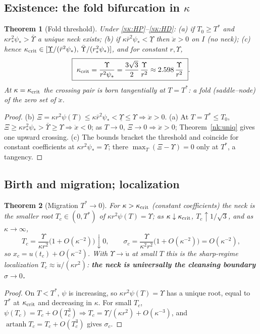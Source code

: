 \documentclass[11pt,a4paper]{article}
\theoremstyle{plain}
\newtheorem{theorem}{Theorem}[section]
\theoremstyle{definition}
\theoremstyle{remark}
\begin{document}
\subsection*{Existence: the fold bifurcation in \texorpdfstring{\(\kappa\)}{kappa}}
\begin{theorem}[Fold threshold]\label{nk:fold}
Under \textsc{\ref{nk:HP}--\ref{nk:HD}}: \textup{(a)} if \(T_0\ge T^*\) and \(\kappa r_*^2\psi_*>\bar\Upsilon\)
a unique neck exists; \textup{(b)} if \(\kappa\bar r^2\psi_*<\underline\Upsilon\) then \(\ddot x>0\)
on \(I\) (no neck); \textup{(c)} hence
\(\kappa_{\rm crit}\in[\underline\Upsilon/(\bar r^2\psi_*),\,\bar\Upsilon/(r_*^2\psi_*)]\), and for
constant \(r,\Upsilon\),
\[
\boxed{\ \kappa_{\rm crit}=\frac{\Upsilon}{r^2\psi_*}=\frac{3\sqrt3}{2}\,\frac{\Upsilon}{r^2}\approx2.598\,\frac{\Upsilon}{r^2}\ }.
\]
At \(\kappa=\kappa_{\rm crit}\) the crossing pair is born tangentially at \(T=T^*\): a fold
(saddle--node) of the zero set of \(\ddot x\).
\end{theorem}
\begin{proof}
(b) \(\Xi=\kappa r^2\psi(T)\le\kappa\bar r^2\psi_*<\underline\Upsilon\le\Upsilon\Rightarrow\ddot x>0\).
(a) At \(T=T^*\le T_0\), \(\Xi\ge\kappa r_*^2\psi_*>\bar\Upsilon\ge\Upsilon\Rightarrow\ddot x<0\); as
\(T\to0\), \(\Xi\to0\Rightarrow\ddot x>0\); Theorem~\ref{nk:uniq} gives one upward crossing. (c) The
bounds bracket the threshold and coincide for constant coefficients at \(\kappa r^2\psi_*=\Upsilon\);
there \(\max_T(\Xi-\Upsilon)=0\) only at \(T^*\), a tangency.
\end{proof}

\subsection*{Birth and migration; localization}
\begin{theorem}[Migration \texorpdfstring{\(T^*\to0\)}{}]\label{nk:mig}
For \(\kappa>\kappa_{\rm crit}\) (constant coefficients) the neck is the smaller root \(T_c\in(0,T^*)\)
of \(\kappa r^2\psi(T)=\Upsilon\); as \(\kappa\downarrow\kappa_{\rm crit}\), \(T_c\uparrow1/\sqrt3\),
and as \(\kappa\to\infty\),
\[
T_c=\frac{\Upsilon}{\kappa r^2}\bigl(1+O(\kappa^{-2})\bigr)\downarrow0,\qquad
\sigma_c=\frac{\Upsilon}{\kappa^2r^2}\bigl(1+O(\kappa^{-2})\bigr)=O(\kappa^{-2}),
\]
so \(x_c=u(t_c)+O(\kappa^{-2})\). With \(\Upsilon\to\ddot u\) at small \(T\) this is the sharp-regime
localization \(T_c\approx\ddot u/(\kappa r^2)\): \textbf{the neck is universally the cleansing
boundary \(\sigma\to0\).}
\end{theorem}
\begin{proof}
On \(T<T^*\), \(\psi\) is increasing, so \(\kappa r^2\psi(T)=\Upsilon\) has a unique root, equal to
\(T^*\) at \(\kappa_{\rm crit}\) and decreasing in \(\kappa\). For small \(T_c\),
\(\psi(T_c)=T_c+O(T_c^3)\Rightarrow T_c=\Upsilon/(\kappa r^2)+O(\kappa^{-3})\), and
\(\operatorname{artanh}T_c=T_c+O(T_c^3)\) gives \(\sigma_c\).
\end{proof}
\end{document}
